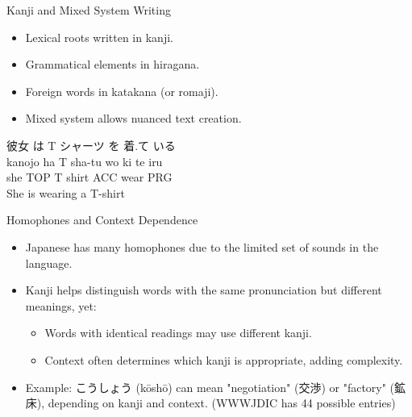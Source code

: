 \documentclass[xetex]{beamer}
\begin{document}
\begin{frame}{Kanji and Mixed System Writing}
\begin{itemize}
    \item Lexical roots written in kanji.
    \item Grammatical elements in hiragana.
    \item Foreign words in katakana (or romaji).
    \item Mixed system allows nuanced text creation.
    \end{itemize}
    \begin{exe}
      \ex \glll 彼女 は T シャーツ を 着.て いる \\
      kanojo ha T sha-tu wo {ki te} iru \\
      she TOP T shirt ACC wear PRG  \\
      \trans She is wearing a T-shirt
    \end{exe}

    
\end{frame}


\begin{frame}{Homophones and Context Dependence}
\begin{itemize}
    \item Japanese has many homophones due to the limited set of sounds in the language.
    \item Kanji helps distinguish words with the same pronunciation but different meanings, yet:
    \begin{itemize}
        \item Words with identical readings may use different kanji.
        \item Context often determines which kanji is appropriate, adding complexity.
    \end{itemize}
    \item Example: \textjapanese{こうしょう} (kōshō) can mean "negotiation" (\textjapanese{交渉}) or "factory" (\textjapanese{鉱床}), depending on kanji and context. (WWWJDIC has 44 possible entries)

\end{itemize}
\end{frame}
\end{document}
